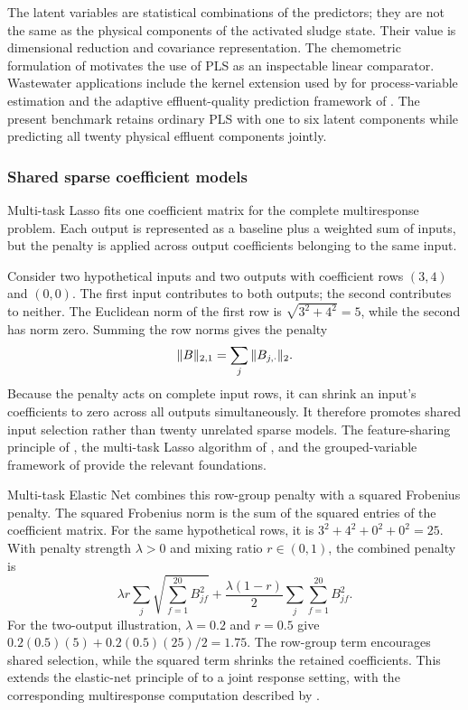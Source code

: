 The latent variables are statistical combinations of the predictors; they are not the same as the physical components of the activated sludge state. Their value is dimensional reduction and covariance representation. The chemometric formulation of \citet{Wold2001} motivates the use of PLS as an inspectable linear comparator. Wastewater applications include the kernel extension used by \citet{Woo2009} for process-variable estimation and the adaptive effluent-quality prediction framework of \citet{Yang2021}. The present benchmark retains ordinary PLS with one to six latent components while predicting all twenty physical effluent components jointly.

\subsubsection{Shared sparse coefficient models}

Multi-task Lasso fits one coefficient matrix for the complete multiresponse problem. Each output is represented as a baseline plus a weighted sum of inputs, but the penalty is applied across output coefficients belonging to the same input.

Consider two hypothetical inputs and two outputs with coefficient rows $(3,4)$ and $(0,0)$. The first input contributes to both outputs; the second contributes to neither. The Euclidean norm of the first row is
$\sqrt{3^2+4^2}=5$, while the second has norm zero. Summing the row norms gives the penalty
\begin{equation}
\equationname{Row-group penalty for multiresponse regression coefficients}
\|B\|_{2,1}=\sum_j\|B_{j,\cdot}\|_2.
\label{eq:multiresponse_row_penalty}
\end{equation}
Because the penalty acts on complete input rows, it can shrink an input's coefficients to zero across all outputs simultaneously. It therefore promotes shared input selection rather than twenty unrelated sparse models. The feature-sharing principle of \citet{Argyriou2008}, the multi-task Lasso algorithm of \citet{Liu2009}, and the grouped-variable framework of \citet{Yuan2006} provide the relevant foundations.

Multi-task Elastic Net combines this row-group penalty with a squared Frobenius penalty. The squared Frobenius norm is the sum of the squared entries of the coefficient matrix. For the same hypothetical rows, it is
$3^2+4^2+0^2+0^2=25$.
With penalty strength $\lambda>0$ and mixing ratio $r\in(0,1)$, the combined penalty is
\[
\lambda r\sum_j\sqrt{\sum_{f=1}^{20}B_{jf}^2}
+\frac{\lambda(1-r)}2\sum_j\sum_{f=1}^{20}B_{jf}^2.
\]
For the two-output illustration, $\lambda=0.2$ and $r=0.5$ give
$0.2(0.5)(5)+0.2(0.5)(25)/2=1.75$.
The row-group term encourages shared selection, while the squared term shrinks the retained coefficients. This extends the elastic-net principle of \citet{Zou2005} to a joint response setting, with the corresponding multiresponse computation described by \citet{Simon2013}.

